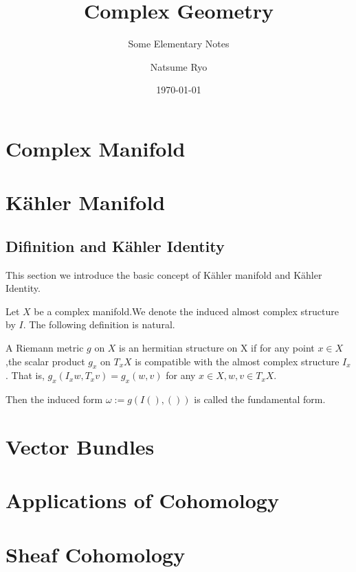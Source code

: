 \documentclass[12pt]{elegantbook}
\title{Complex Geometry}
\subtitle{Some Elementary Notes}
\author{Natsume Ryo}
\institute{Chern Institue of Mathematical}
\date{\today}
\begin{document}
\maketitle

\frontmatter
\tableofcontents

\mainmatter
\chapter{Complex Manifold}

\chapter{K\"{a}hler Manifold}
\section{Difinition and K\"{a}hler Identity}
This section we introduce the basic concept of K\"{a}hler manifold and K\"{a}hler Identity.

Let $X$ be a complex manifold.We denote the induced almost complex structure by $I$. The following definition is natural.

\begin{definition}
A Riemann metric $g$ on $X$ is an hermitian structure on X if for any point $x \in X$,the scalar product $g_x$ on $T_x X$ is compatible with the almost complex structure $I_x$. That is, $g_x(I_x w,T_x v)=g_x(w,v)$ for any $x \in X,w,v \in T_x X$.

Then the induced form $\omega:=g(I(),())$ is called the fundamental form.
\end{definition}

\chapter{Vector Bundles}

\chapter{Applications of Cohomology}



\nocite{en2,en3}

\printbibliography[heading=bibintoc, title=\ebibname]
\appendix


\chapter{Sheaf Cohomology}
\end{document}
